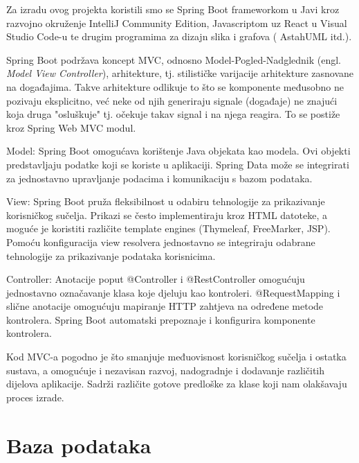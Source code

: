 Za izradu ovog projekta koristili smo se Spring Boot frameworkom u Javi kroz
razvojno okruženje IntelliJ Community Edition, Javascriptom uz React u Visual
Studio Code-u te drugim programima za dizajn slika i grafova ( AstahUML itd.).


 Spring Boot podržava koncept MVC, odnosno Model-Pogled-Nadglednik
(engl. \textit{Model View Controller}), arhitekture, tj. stilističke varijacije arhitekture zasnovane 
na događajima. Takve arhitekture odlikuje to što se komponente međusobno ne pozivaju
eksplicitno, već neke od njih generiraju signale (događaje) ne znajući koja druga
"osluškuje" tj. očekuje takav signal i na njega reagira. To se postiže kroz Spring Web MVC modul. 
\begin{packed_item}
	\item Model: Spring Boot omogućava korištenje Java objekata kao modela. Ovi objekti predstavljaju podatke koji se koriste u aplikaciji.
	Spring Data može se integrirati za jednostavno upravljanje podacima i komunikaciju s bazom podataka.
	\item View: Spring Boot pruža fleksibilnost u odabiru tehnologije za prikazivanje korisničkog sučelja. Prikazi se često implementiraju kroz HTML datoteke, a moguće je koristiti različite template engines (Thymeleaf, FreeMarker, JSP).
	Pomoću konfiguracija view resolvera jednostavno se integriraju odabrane tehnologije za prikazivanje podataka korisnicima.
	\item Controller: Anotacije poput @Controller i @RestController omogućuju jednostavno označavanje klasa koje djeluju kao kontroleri.
	@RequestMapping i slične anotacije omogućuju mapiranje HTTP zahtjeva na određene metode kontrolera.
	Spring Boot automatski prepoznaje i konfigurira komponente kontrolera.		
\end{packed_item}

Kod MVC-a pogodno je što smanjuje međuovisnost korisničkog sučelja i ostatka sustava, a omogućuje i nezavisan razvoj, nadogradnje i dodavanje različitih dijelova aplikacije. Sadrži različite
gotove predloške za klase koji nam olakšavaju proces izrade.
				
		\section{Baza podataka}
			    


